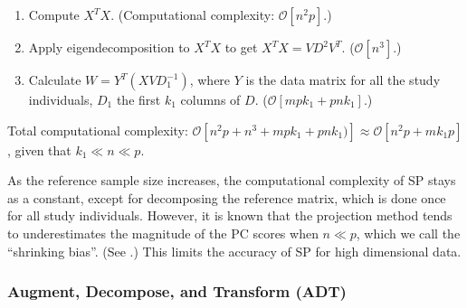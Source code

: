 \documentclass{article}
\newcommand{\bO}{\mathcal{O}}
\begin{document}
\begin{enumerate}
\item Compute $X^T X$.
  (Computational complexity: $\bO[n^2p]$.)  
\item Apply eigendecomposition to $X^T X$ to get $X^T X = V D^2 V^T$.
  ($\bO[n^3]$.)
\item Calculate $W = Y^T (X V D_1^{-1})$, where $Y$ is the data matrix for all the study individuals, $D_1$ the first $k_1$ columns of $D$. ($\bO[mpk_1 + pnk_1]$.)
\end{enumerate}

Total computational complexity: $\bO[n^2p + n^3 + mpk_1 + pnk_1)] \approx \bO[n^2p + mk_1p]$,
given that $k_1 \ll n \ll p$.

As the reference sample size increases,
the computational complexity of SP stays as a constant,
except for decomposing the reference matrix, which is done once for all study individuals.
However, it is known that the projection method tends to underestimates the magnitude of the PC scores when $n \ll p$,
which we call the ``shrinking bias''. (See \cite{dey}.)
This limits the accuracy of SP for high dimensional data.

\subsubsection{Augment, Decompose, and Transform (ADT)}
\end{document}
